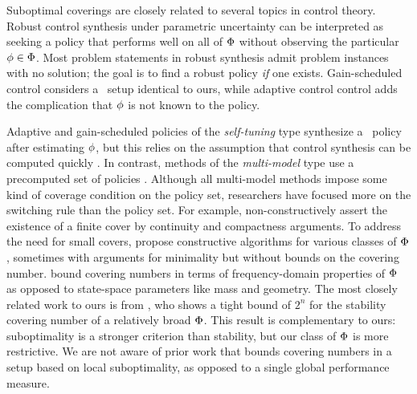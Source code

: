 \label{sec:related}

Suboptimal coverings are closely related to several topics in control theory.
Robust control synthesis under parametric uncertainty
\citep{dullerud-robust}
can be interpreted as seeking a policy that performs well on all of $\Phi$
without observing the particular ${\phi \in \Phi}$.
Most problem statements in robust synthesis admit problem instances with no solution; the goal is to find a robust policy \emph{if} one exists.
Gain-scheduled control considers a \multienv\ setup identical to ours,
while adaptive control control
adds the complication that $\phi$ is not known to the policy.

Adaptive and gain-scheduled policies
of the \emph{self-tuning} type
synthesize a \singleenv\ policy after estimating $\phi$,
but this relies on the assumption that control synthesis can be computed quickly
\citep{astrom-adaptive}.
In contrast, methods of the \emph{multi-model} type use a precomputed set of policies
\citep{murray-smith-multimodel}.
Although all multi-model methods impose some kind of coverage condition on the policy set,
researchers have focused more on the switching rule than the policy set.
For example,
\citet{fu-adaptive-switching,stilwell-interpolation,yoon-gain-scheduling-minimax}
non-constructively assert the existence of a finite cover
by continuity and compactness arguments.
To address the need for small covers,
\citet{anderson-coverings,mcnichols-selecting-discrete,tan-selecting,fekri-issues,du-multimodel-integrated}
propose constructive algorithms for various classes of $\Phi$,
sometimes with arguments for minimality
but without bounds on the covering number.
\citet{jalali-multimodel-vinnicombe}
bound covering numbers in terms of frequency-domain properties of $\Phi$
as opposed to state-space parameters like mass and geometry.
The most closely related work to ours is from \citet{fu-minimum-switching},
who shows a tight bound of $2^n$
for the stability covering number
of a relatively broad $\Phi$. %
This result is complementary to ours:
suboptimality is a stronger criterion than stability,
but our class of $\Phi$ is more restrictive.
We are not aware of prior work that bounds covering numbers in a setup based on local suboptimality,
as opposed to a single global performance measure.



